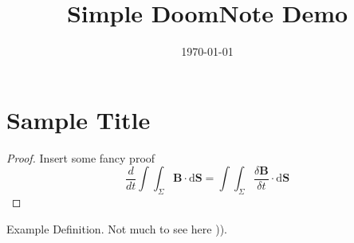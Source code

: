 \documentclass{doomnote}
\title{Simple DoomNote Demo}
\date{\today}
\begin{document}
\tableofcontents
\section{Sample Title}
\lipsum[2]
\begin{theorem}
  \lipsum[2]
\end{theorem}

\begin{proof}
  {\textasteriskcentered}
  Insert some fancy proof
  {\textasteriskcentered}\\
  \begin{equation*}
    \frac{d}{dt}\int\int_{\Sigma}\textbf{B} \cdot \text{d}\textbf{S} = \int\int_{\Sigma}\frac{\delta\textbf{B}}{\delta{t}} \cdot \text{d}\textbf{S}
  \end{equation*}
\end{proof}
\begin{eg}
  \lipsum[2]
\end{eg}

\begin{definition}
  Example Definition. Not much to see here )).
\end{definition}
\end{document}
